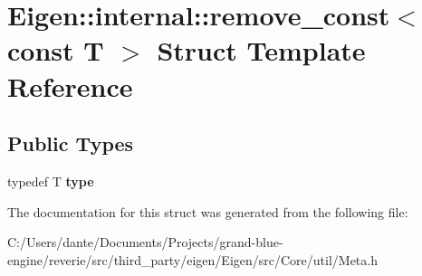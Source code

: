 \hypertarget{struct_eigen_1_1internal_1_1remove__const_3_01const_01_t_01_4}{}\section{Eigen\+::internal\+::remove\+\_\+const$<$ const T $>$ Struct Template Reference}
\label{struct_eigen_1_1internal_1_1remove__const_3_01const_01_t_01_4}
\subsection*{Public Types}
\begin{DoxyCompactItemize}
\item 
\mbox{\label{struct_eigen_1_1internal_1_1remove__const_3_01const_01_t_01_4_a454aa1ca0009359ceb5405db5419f302}} 
typedef T {\bfseries type}
\end{DoxyCompactItemize}


The documentation for this struct was generated from the following file\+:\begin{DoxyCompactItemize}
\item 
C\+:/\+Users/dante/\+Documents/\+Projects/grand-\/blue-\/engine/reverie/src/third\+\_\+party/eigen/\+Eigen/src/\+Core/util/Meta.\+h\end{DoxyCompactItemize}
